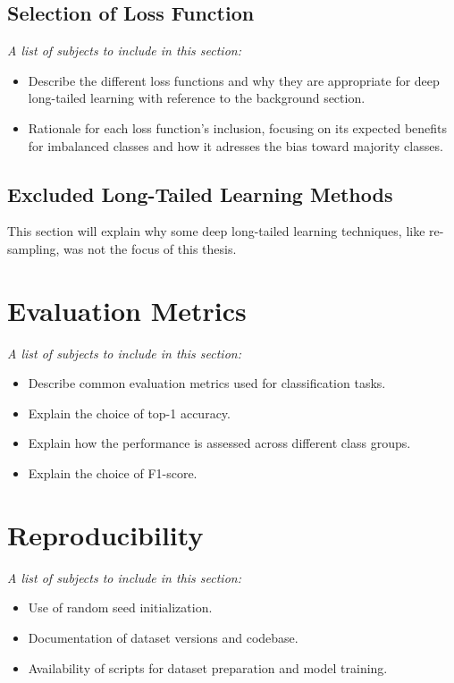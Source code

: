 \subsection{Selection of Loss Function}
\textit{A list of subjects to include in this section:}

 \begin{itemize}
    \item Describe the different loss functions and why they are appropriate for deep long-tailed learning with reference to the background section.
    \item Rationale for each loss function's inclusion, focusing on its expected benefits for imbalanced classes and how it adresses the bias toward majority classes.
 \end{itemize}

\subsection{Excluded Long-Tailed Learning Methods}
This section will explain why some deep long-tailed learning techniques, like re-sampling, was not the focus of this thesis.

\section{Evaluation Metrics}
\textit{A list of subjects to include in this section:}

\begin{itemize}
    \item Describe common evaluation metrics used for classification tasks.
    \item Explain the choice of top-1 accuracy.
    \item Explain how the performance is assessed across different class groups.
    \item Explain the choice of F1-score.
\end{itemize}

\section{Reproducibility}
\textit{A list of subjects to include in this section:}

\begin{itemize}
    \item Use of random seed initialization.
    \item Documentation of dataset versions and codebase.
    \item Availability of scripts for dataset preparation and model training.
\end{itemize}

